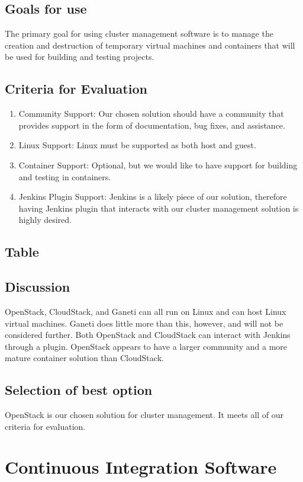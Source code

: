 \documentclass[10pt,letterpaper,onecolumn,journal]{IEEEtran}
\begin{document}
\subsection{Goals for use}
The primary goal for using cluster management software is to manage the creation and destruction of temporary virtual machines and containers that will be used for building and testing projects.
\subsection{Criteria for Evaluation}
\begin{enumerate}
  \item Community Support: Our chosen solution should have a community that provides support in the form of documentation, bug fixes, and assistance.
  \item Linux Support: Linux must be supported as both host and guest.
  \item Container Support: Optional, but we would like to have support for building and testing in containers.
  \item Jenkins Plugin Support: Jenkins is a likely piece of our solution, therefore having Jenkins plugin that interacts with our cluster management solution is highly desired.
\end{enumerate}
\subsection{Table}
\subsection{Discussion}
OpenStack, CloudStack, and Ganeti can all run on Linux and can host Linux virtual machines.
Ganeti does little more than this, however, and will not be considered further.
Both OpenStack and CloudStack can interact with Jenkins through a plugin.
OpenStack appears to have a larger community and a more mature container solution than CloudStack.
\subsection{Selection of best option}
OpenStack is our chosen solution for cluster management. It meets all of our criteria for evaluation.


\section{Continuous Integration Software}
\end{document}
